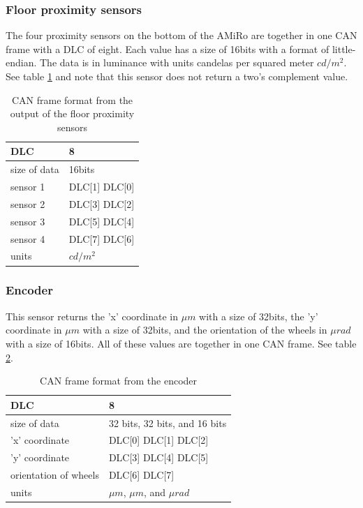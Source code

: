 \documentclass[12pt]{report}%
\begin{document}
\subsubsection{Floor proximity sensors}
The four proximity sensors on the bottom of the AMiRo are together in one CAN frame with a DLC of eight. Each value has a size of 16bits with a format of little-endian. The data is in luminance with units candelas per squared meter $cd/m^2$. See table \ref{tab:floorprox} and note that this sensor does not return a two's complement value.

\begin{table}[h!]
\centering
\begin{tabular}{|l|l|}
	\hline
	DLC						&	8													\\	\hline
	size of data	&	16bits										\\	\hline
	sensor 1			&	DLC[1] DLC[0]							\\	\hline
  sensor 2			&	DLC[3] DLC[2]							\\	\hline
	sensor 3			&	DLC[5] DLC[4]							\\	\hline
	sensor 4			&	DLC[7] DLC[6]							\\	\hline
	units					&	$cd/m^2$									\\	\hline
\end{tabular}
\caption{\label{tab:floorprox} CAN frame format from the output of the floor proximity sensors}
\end{table}

\subsubsection{Encoder}
This sensor returns the 'x' coordinate in $\mu m$ with a size of 32bits, the 'y' coordinate in $\mu m$ with a size of 32bits, and the orientation of the wheels in $\mu rad$ with a size of 16bits. All of these values are together in one CAN frame. See table \ref{tab:encoder}.

\begin{table}[h!]
\centering
\begin{tabular}{|l|l|}
	\hline
	DLC										&	8																\\	\hline
	size of data					&	32 bits, 32 bits, and 16 bits		\\	\hline
	'x' coordinate				&	DLC[0] DLC[1] DLC[2] 						\\	\hline
	'y'	coordinate				&	DLC[3] DLC[4] DLC[5] 						\\	\hline
	orientation of wheels	&	DLC[6] DLC[7] 									\\	\hline
	units									&	$\mu m$, $\mu m$, and $\mu rad$	\\	\hline
\end{tabular}
\caption{\label{tab:encoder} CAN frame format from the encoder}
\end{table}
\end{document}
